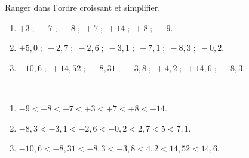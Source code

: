 \begin{exercice*}
    Ranger dans l'ordre croissant et simplifier.
    {\baselineskip=7mm
    \begin{enumerate}
       \item $+3 \; ; \; -7 \;;\;-8 \;;\; +7 \;; \;+14\; ;\; +8 \;;\; -9$.
       \item $+5,0\; ; \;+2,7 \;;\; -2,6\; ; \;-3,1\; ; \;+7,1\; ; \;-8,3\; ;\; -0,2$.
       \item $-10,6 \;; \;+14,52\; ;\; -8,31 \;; \;-3,8 \;; \;+4,2 \;; \;+14,6\; ;\; -8,3$.
    \end{enumerate}}  
 \end{exercice*}
 
 \begin{corrige}
    \ \\ [-7mm]
    {\baselineskip=7mm
    \begin{enumerate}
       \item \red $-9<-8<-7<+3<+7<+8<+14$.
       \item \red $-8,3<-3,1<-2,6<-0,2<2,7<5<7,1$.
       \item \red$-10,6<-8,31<-8,3<-3,8<4,2<14,52<14,6$.
    \end{enumerate}}  
 \end{corrige}